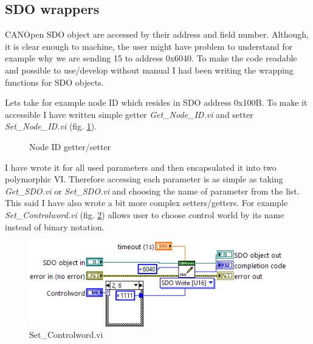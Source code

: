 \subsection{SDO wrappers}\label{SDO_wrappers}
CANOpen SDO object are accessed by their address and field number. Although, it is clear enough to machine, the user might have problem to understand for example why we are sending 15 to address 0x6040. To make the code readable and possible to use/develop without manual I had been writing the wrapping functions for SDO objects.

Lets take for example node ID which resides in SDO address 0x100B. To make it accessible I have written simple getter \textit{Get\_Node\_ID.vi} and setter \textit{Set\_Node\_ID.vi} (fig. \ref{vi:set_get_nodeid}).
\begin{figure}[h]
    \centering
    \caption{Node ID getter/setter}
    \label{vi:set_get_nodeid}
\end{figure}
I have wrote it for all used parameters and then encapsulated it into two polymorphic VI. Therefore accessing each parameter is as simple as taking \textit{Get\_SDO.vi} or \textit{Set\_SDO.vi} and choosing the name of parameter from the list.%
This said I have also wrote a bit more complex setters/getters. For example \textit{Set\_Controlword.vi} (fig. \ref{vi:Set_Controlword}) allows user to choose control world by its name instead of binary notation.
\begin{figure}[H]
    \centering
    \includegraphics[scale=\visc,max width=\textwidth]{figures/Set_Controlwordd}
    \caption{Set\_Controlword.vi}
    \label{vi:Set_Controlword}
\end{figure}
